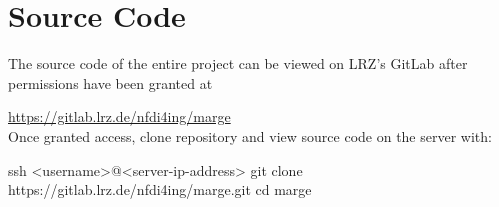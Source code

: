 \chapter{Source Code}\label{chapter:code}

The source code of the entire project can be viewed on LRZ's GitLab after
permissions have been granted at

\url{https://gitlab.lrz.de/nfdi4ing/marge} \\

\noindent Once granted access, clone repository and view source code on the server with:

\begin{terminal}
    ssh <username>@<server-ip-address>
    git clone https://gitlab.lrz.de/nfdi4ing/marge.git
    cd marge
\end{terminal}
